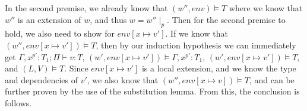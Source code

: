 			In the second premise, we already know that $(w'',env)\models T$ where we know that $w''$ is an extension of $w$, and thus $w=w''\mid_p$.
			Then for the second premise to hold, we also need to show for $env[x\mapsto v']$.
			If we know that $(w'',env[x\mapsto v'])\models T$, then by our induction hypothesis we can immediately get $\Gamma,x^{p'}:T_1;\Pi\vdash v:T$, $(w',env[x\mapsto v'])\models\Gamma,x^{p'}:T_1$, $(w',env[x\mapsto v'])\models T$, and $(L,V)\models T$.
			Since $env[x\mapsto v']$ is a local extension, and we know the type and dependencies of $v'$, we also know that $(w'',env[x\mapsto v])\models T$, and can be further proven by the use of the substitution lemma.
			From this, the conclusion is follows.
